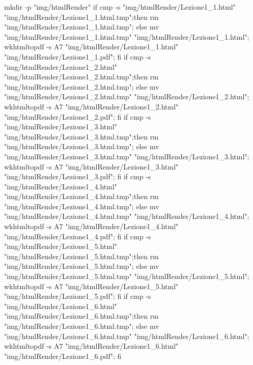 mkdir -p "img/htmlRender"
if cmp -s "img/htmlRender/Lezione1_1.html" "img/htmlRender/Lezione1_1.html.tmp";then rm "img/htmlRender/Lezione1_1.html.tmp"; else mv "img/htmlRender/Lezione1_1.html.tmp" "img/htmlRender/Lezione1_1.html"; wkhtmltopdf -s A7 "img/htmlRender/Lezione1_1.html" "img/htmlRender/Lezione1_1.pdf"; fi
if cmp -s "img/htmlRender/Lezione1_2.html" "img/htmlRender/Lezione1_2.html.tmp";then rm "img/htmlRender/Lezione1_2.html.tmp"; else mv "img/htmlRender/Lezione1_2.html.tmp" "img/htmlRender/Lezione1_2.html"; wkhtmltopdf -s A7 "img/htmlRender/Lezione1_2.html" "img/htmlRender/Lezione1_2.pdf"; fi
if cmp -s "img/htmlRender/Lezione1_3.html" "img/htmlRender/Lezione1_3.html.tmp";then rm "img/htmlRender/Lezione1_3.html.tmp"; else mv "img/htmlRender/Lezione1_3.html.tmp" "img/htmlRender/Lezione1_3.html"; wkhtmltopdf -s A7 "img/htmlRender/Lezione1_3.html" "img/htmlRender/Lezione1_3.pdf"; fi
if cmp -s "img/htmlRender/Lezione1_4.html" "img/htmlRender/Lezione1_4.html.tmp";then rm "img/htmlRender/Lezione1_4.html.tmp"; else mv "img/htmlRender/Lezione1_4.html.tmp" "img/htmlRender/Lezione1_4.html"; wkhtmltopdf -s A7 "img/htmlRender/Lezione1_4.html" "img/htmlRender/Lezione1_4.pdf"; fi
if cmp -s "img/htmlRender/Lezione1_5.html" "img/htmlRender/Lezione1_5.html.tmp";then rm "img/htmlRender/Lezione1_5.html.tmp"; else mv "img/htmlRender/Lezione1_5.html.tmp" "img/htmlRender/Lezione1_5.html"; wkhtmltopdf -s A7 "img/htmlRender/Lezione1_5.html" "img/htmlRender/Lezione1_5.pdf"; fi
if cmp -s "img/htmlRender/Lezione1_6.html" "img/htmlRender/Lezione1_6.html.tmp";then rm "img/htmlRender/Lezione1_6.html.tmp"; else mv "img/htmlRender/Lezione1_6.html.tmp" "img/htmlRender/Lezione1_6.html"; wkhtmltopdf -s A7 "img/htmlRender/Lezione1_6.html" "img/htmlRender/Lezione1_6.pdf"; fi
